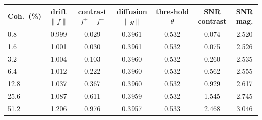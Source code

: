 \begin{center}\small
\begin{tabular}{lcccccc}
\toprule
Coh.\ (\%) & drift $\lVert f\rVert$ & contrast $f^{+}\!-\!f^{-}$ & diffusion $\lVert g\rVert$ & threshold $\theta$ & SNR contrast & SNR mag. \\
\midrule
  0.8  & 0.999 & 0.029 & 0.3961 & 0.532 & 0.074 & 2.520 \\
  1.6  & 1.001 & 0.030 & 0.3961 & 0.532 & 0.075 & 2.526 \\
  3.2  & 1.004 & 0.103 & 0.3960 & 0.532 & 0.260 & 2.535 \\
  6.4  & 1.012 & 0.222 & 0.3960 & 0.532 & 0.562 & 2.555 \\
 12.8  & 1.037 & 0.367 & 0.3960 & 0.532 & 0.929 & 2.617 \\
 25.6  & 1.087 & 0.611 & 0.3959 & 0.532 & 1.545 & 2.745 \\
 51.2  & 1.206 & 0.976 & 0.3957 & 0.533 & 2.468 & 3.046 \\
\bottomrule
\end{tabular}
\end{center}